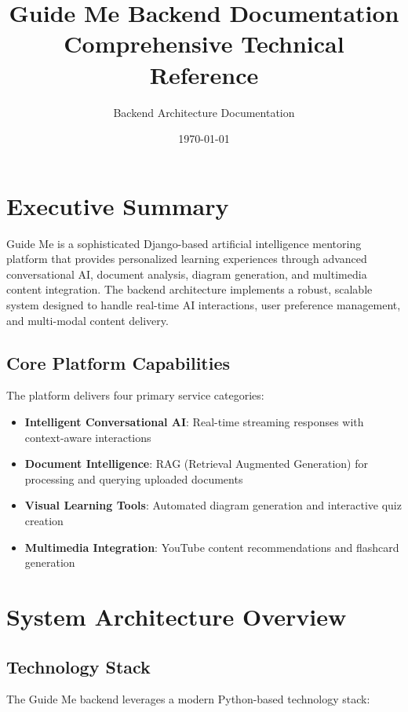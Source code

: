 \documentclass[12pt,a4paper]{article}
\title{\Huge\textbf{Guide Me Backend Documentation} \\ \Large Comprehensive Technical Reference}
\author{Backend Architecture Documentation}
\date{\today}
\begin{document}
\maketitle
\thispagestyle{empty}

\newpage
\tableofcontents
\newpage

\section{Executive Summary}

Guide Me is a sophisticated Django-based artificial intelligence mentoring platform that provides personalized learning experiences through advanced conversational AI, document analysis, diagram generation, and multimedia content integration. The backend architecture implements a robust, scalable system designed to handle real-time AI interactions, user preference management, and multi-modal content delivery.

\subsection{Core Platform Capabilities}

The platform delivers four primary service categories:
\begin{itemize}
    \item \textbf{Intelligent Conversational AI}: Real-time streaming responses with context-aware interactions
    \item \textbf{Document Intelligence}: RAG (Retrieval Augmented Generation) for processing and querying uploaded documents
    \item \textbf{Visual Learning Tools}: Automated diagram generation and interactive quiz creation
    \item \textbf{Multimedia Integration}: YouTube content recommendations and flashcard generation
\end{itemize}

\section{System Architecture Overview}

\subsection{Technology Stack}

The Guide Me backend leverages a modern Python-based technology stack:
\end{document}
